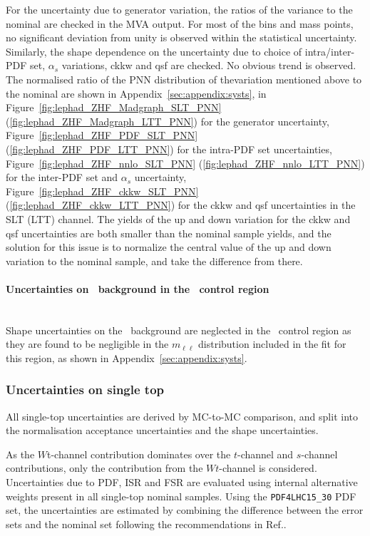 For the uncertainty due to generator variation, 
the ratios of the variance to the nominal are checked in the MVA output. 
For most of the bins and mass points, no significant deviation from unity is observed
within the statistical uncertainty.
Similarly, the shape dependence on the uncertainty due to choice of intra/inter-PDF set,
$\alpha_s$ variations, ckkw and qsf are checked. 
No obvious trend is observed. The normalised ratio of 
the PNN distribution of thevariation mentioned above to
the nominal are shown in Appendix~\ref{sec:appendix:systs}, 
in Figure~\ref{fig:lephad_ZHF_Madgraph_SLT_PNN} (\ref{fig:lephad_ZHF_Madgraph_LTT_PNN})
for the generator uncertainty, 
Figure~\ref{fig:lephad_ZHF_PDF_SLT_PNN} (\ref{fig:lephad_ZHF_PDF_LTT_PNN})
for the intra-PDF set uncertainties,
Figure~\ref{fig:lephad_ZHF_nnlo_SLT_PNN} (\ref{fig:lephad_ZHF_nnlo_LTT_PNN})
for the inter-PDF set and $\alpha_s$ uncertainty,
Figure~\ref{fig:lephad_ZHF_ckkw_SLT_PNN} (\ref{fig:lephad_ZHF_ckkw_LTT_PNN})
for the ckkw and qsf uncertainties in the SLT (LTT) channel.
The yields of the up and down variation for the ckkw and qsf 
uncertainties are both smaller than the nominal sample yields, 
and the solution for this issue is to normalize 
the central value of the up and down variation to the nominal sample, 
and take the difference from there. 

\paragraph{Uncertainties on \ZHF\ background in the \ZHF\ control region}\mbox{}\\

Shape uncertainties on the \ZHF\ background 
are neglected in the \ZHF\ control region as they are
found to be negligible in the $m_{\ell\ell}$ distribution included 
in the fit for this region, as shown in 
Appendix~\ref{sec:appendix:systs}.










\subsubsection{Uncertainties on single top}
\label{sec:DiHiggs:singletopsysts}
All single-top uncertainties are derived by MC-to-MC comparison,  
and split into the normalisation acceptance uncertainties and the 
shape uncertainties.


As the $W$t-channel contribution dominates over the $t$-channel and $s$-channel 
contributions, only the contribution from the $Wt$-channel is considered. 
Uncertainties due to PDF, ISR
and FSR are evaluated using internal alternative
weights present in all single-top nominal samples. 
Using the \texttt{PDF4LHC15\_30} PDF set, 
the uncertainties are estimated by combining the 
difference between the error sets and the nominal 
set following the recommendations in Ref.\cite{Butterworth:2015oua}.

